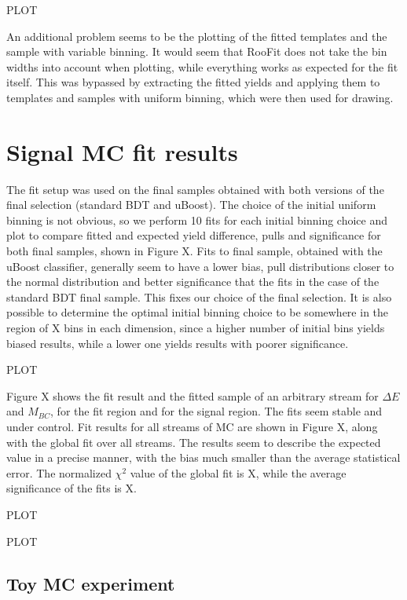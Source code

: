 \documentclass[  headings=standardclasses,
  headings=big,oneside,a4paper,openany,12pt]{scrbook}
\begin{document}
PLOT

An additional problem seems to be the plotting of the fitted templates and the sample with variable binning. It would seem that RooFit does not take the bin widths into account when plotting, while everything works as expected for the fit itself. This was bypassed by extracting the fitted yields and applying them to templates and samples with uniform binning, which were then used for drawing.

\section{Signal MC fit results}\label{sec:signal-mc-fit-results}

The fit setup was used on the final samples obtained with both versions of the final selection (standard BDT and uBoost). The choice of the initial uniform binning is not obvious, so we perform 10 fits for each initial binning choice and plot to compare fitted and expected yield difference, pulls and significance for both final samples, shown in Figure X. Fits to final sample, obtained with the uBoost classifier, generally seem to have a lower bias, pull distributions closer to the normal distribution and better significance that the fits in the case of the standard BDT final sample. This fixes our choice of the final selection. It is also possible to determine the optimal initial binning choice to be somewhere in the region of X bins in each dimension, since a higher number of initial bins yields biased results, while a lower one yields results with poorer significance.

PLOT

Figure X shows the fit result and the fitted sample of an arbitrary stream for $\Delta E$ and $M_{BC}$, for the fit region and for the signal region. The fits seem stable and under control. Fit results for all streams of MC are shown in Figure X, along with the global fit over all streams. The results seem to describe the expected value in a precise manner, with the bias much smaller than the average statistical error. The normalized $\chi^2$ value of the global fit is X, while the average significance of the fits is X.

PLOT

PLOT

\subsection{Toy MC experiment}
\end{document}
